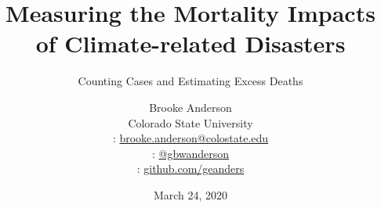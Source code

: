 \usepackage{booktabs}
\usepackage{array}
\usepackage{colortbl}
\usepackage[british]{babel}
\usepackage{graphicx,hyperref,url}
\usepackage{fontawesome}
\usepackage{hyperref}
\usepackage{adjustbox}
\usepackage{appendixnumberbeamer}
\hypersetup{colorlinks=true,allcolors=blue}
\usepackage{xcolor}

\title{Measuring the Mortality Impacts of Climate-related Disasters}
\subtitle{Counting Cases and Estimating Excess Deaths}
\date{March 24, 2020}

\author[Anderson]{
  Brooke Anderson\\ 
  Colorado State University \medskip \\ 
  {\small \faEnvelope: \url{brooke.anderson@colostate.edu}} \\
  {\small \faTwitter: \href{www.twitter.com/gbwanderson}{@gbwanderson}} \\
  {\small \faGithub:  \url{github.com/geanders}}
  }


